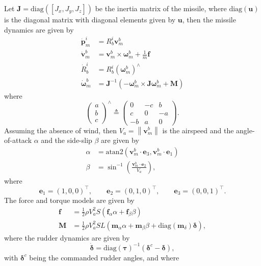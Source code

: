 \documentclass{article}
\newcommand{\norm}[1]{\left\|#1\right\|}
\newcommand{\ebf}{\mathbf{e}}
\newcommand{\fbf}{\mathbf{f}}
\newcommand{\mbf}{\mathbf{m}}
\newcommand{\pbf}{\mathbf{p}}
\newcommand{\ubf}{\mathbf{u}}
\newcommand{\vbf}{\mathbf{v}}
\newcommand{\Jbf}{\mathbf{J}}
\newcommand{\Mbf}{\mathbf{M}}
\newcommand{\deltabf}{\boldsymbol{\delta}}
\newcommand{\omegabf}{\boldsymbol{\omega}}
\newcommand{\taubf}{\boldsymbol{\tau}}
\begin{document}
Let $\Jbf=\text{diag}([J_x, J_y, J_z])$ be the inertia matrix of the missile, where $\text{diag}(\ubf)$ is the diagonal matrix with diagonal elements given by $\ubf$, then the missile dynamics are given by
	\begin{align*}
		\dot{\pbf}_m^i &= R_b^i \vbf_m^b \\
		\dot{\vbf}_m^b &= \vbf_m^b \times \omegabf_m^b + \frac{1}{m}\fbf\\
		\dot{R}_b^i &= R_b^i (\omegabf_m^b)^\wedge \\
		\dot{\omegabf}_m^b &= \Jbf^{-1}\left(-\omegabf_m^b \times \Jbf\omegabf_m^b + \Mbf \right)  
	\end{align*}
where
	\[
		\begin{pmatrix} a \\ b \\ c \end{pmatrix}^\wedge \triangleq \begin{pmatrix} 0 & -c & b \\ c & 0 & -a \\ -b & a & 0 \end{pmatrix}.
	\]
Assuming the absence of wind, then $V_a=\norm{\vbf_m^b}$ is the airspeed and the angle-of-attack $\alpha$ and the side-slip $\beta$ are given by
\begin{align}
\alpha &= \text{atan2}(\vbf_m^b\cdot \ebf_3, \vbf_m^b\cdot\ebf_1) \\
\beta &= \sin^{-1}\left(\frac{\vbf_m^b\cdot \ebf_2}{V_a}\right),	
\end{align}
where
\[
\ebf_1 = (1, 0, 0)^\top, \qquad \ebf_2 = (0, 1, 0)^\top, \qquad \ebf_3 = (0, 0, 1)^\top.
\]
The force and torque models are given by
\begin{align*}
	\fbf &= \frac{1}{2}\rho V_a^2 S\left(\fbf_\alpha\alpha + \fbf_\beta \beta\right) \\
	\Mbf &= \frac{1}{2}\rho V_a^2 S L \left(\mbf_\alpha\alpha + \mbf_\beta\beta + \text{diag}(\mbf_\delta)\deltabf \right),
\end{align*}
where the rudder dynamics are given by
\[
	\dot{\deltabf} = \text{diag}(\taubf)^{-1}(\deltabf^c - \deltabf),
\]
with $\deltabf^c$ being the commanded rudder angles, 
and where 
\end{document}
